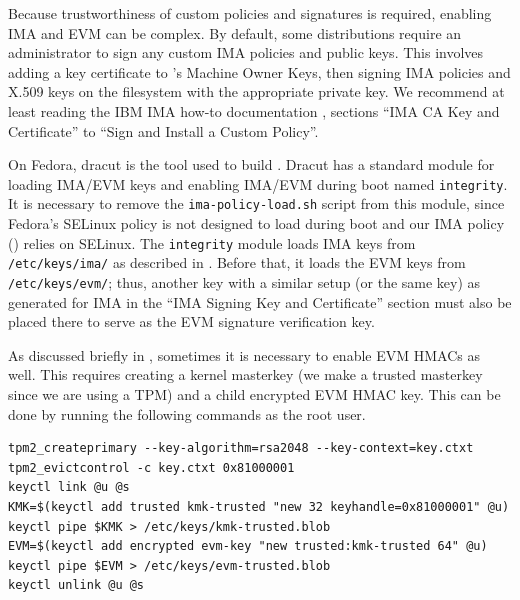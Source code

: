 Because trustworthiness of custom policies and signatures is required, enabling IMA and EVM can be complex.
By default, some distributions require an administrator to sign any custom IMA policies and public keys.
This involves adding a key certificate to \shim's Machine Owner Keys, then signing IMA policies and X.509 keys on the filesystem with the appropriate private key.
We recommend at least reading the IBM IMA how-to documentation \cite{IBM:IMA-utilities-evmctl}, sections ``IMA CA Key and Certificate'' to ``Sign and Install a Custom Policy''.

On Fedora, dracut is the tool used to build \initramfs.
Dracut has a standard module for loading IMA/EVM keys and enabling IMA/EVM during boot named \verb|integrity|.
It is necessary to remove the \verb|ima-policy-load.sh| script from this module, since Fedora's SELinux policy is not designed to load during boot and our IMA policy () relies on SELinux.
The \verb|integrity| module loads IMA keys from \verb|/etc/keys/ima/| as described in \cite{IBM:IMA-utilities-evmctl}.
Before that, it loads the EVM keys from \verb|/etc/keys/evm/|;
thus, another key with a similar setup (or the same key) as generated for IMA in the ``IMA Signing Key and Certificate'' section must also be placed there to serve as the EVM signature verification key.

As discussed briefly in , sometimes it is necessary to enable EVM HMACs as well.
This requires creating a kernel masterkey (we make a trusted masterkey since we are using a TPM) and a child encrypted EVM HMAC key.
This can be done by running the following commands as the root user.
\begin{lstlisting}[style=bash]
tpm2_createprimary --key-algorithm=rsa2048 --key-context=key.ctxt
tpm2_evictcontrol -c key.ctxt 0x81000001
keyctl link @u @s
KMK=$(keyctl add trusted kmk-trusted "new 32 keyhandle=0x81000001" @u)
keyctl pipe $KMK > /etc/keys/kmk-trusted.blob
EVM=$(keyctl add encrypted evm-key "new trusted:kmk-trusted 64" @u)
keyctl pipe $EVM > /etc/keys/evm-trusted.blob
keyctl unlink @u @s
\end{lstlisting}
